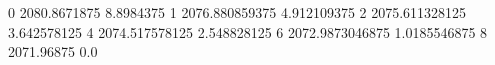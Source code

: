 0 2080.8671875 8.8984375
1 2076.880859375 4.912109375
2 2075.611328125 3.642578125
4 2074.517578125 2.548828125
6 2072.9873046875 1.0185546875
8 2071.96875 0.0
